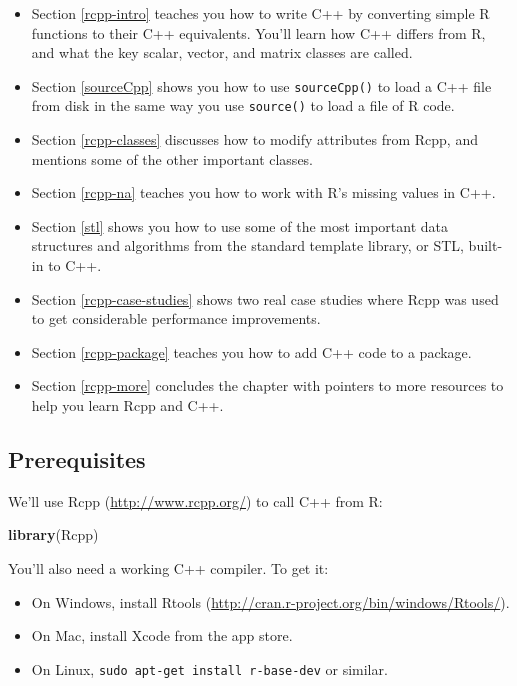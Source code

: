 \documentclass[]{book}
\newenvironment{Shaded}{\begin{snugshade}}{\end{snugshade}}
\newcommand{\KeywordTok}[1]{\textcolor[rgb]{0.27,0.27,0.27}{\textbf{#1}}}
\newcommand{\NormalTok}[1]{#1}
\providecommand{\tightlist}{%
  \setlength{\itemsep}{0pt}\setlength{\parskip}{0pt}}
\renewcommand{\href}[2]{#2 (\url{#1})}
\begin{document}
\begin{itemize}
\item
  Section \ref{rcpp-intro} teaches you how to write C++ by
  converting simple R functions to their C++ equivalents. You'll learn how
  C++ differs from R, and what the key scalar, vector, and matrix classes
  are called.
\item
  Section \ref{sourceCpp} shows you how to use \texttt{sourceCpp()} to load
  a C++ file from disk in the same way you use \texttt{source()} to load a file of
  R code.
\item
  Section \ref{rcpp-classes} discusses how to modify
  attributes from Rcpp, and mentions some of the other important classes.
\item
  Section \ref{rcpp-na} teaches you how to work with R's missing values
  in C++.
\item
  Section \ref{stl} shows you how to use some of the most important data
  structures and algorithms from the standard template library, or STL,
  built-in to C++.
\item
  Section \ref{rcpp-case-studies} shows two real case studies where
  Rcpp was used to get considerable performance improvements.
\item
  Section \ref{rcpp-package} teaches you how to add C++ code
  to a package.
\item
  Section \ref{rcpp-more} concludes the chapter with pointers to
  more resources to help you learn Rcpp and C++.
\end{itemize}

\hypertarget{prerequisites-7}{%
\subsection*{Prerequisites}\label{prerequisites-7}}

We'll use \href{http://www.rcpp.org/}{Rcpp} to call C++ from R:

\begin{Shaded}
\begin{Highlighting}[]
\KeywordTok{library}\NormalTok{(Rcpp)}
\end{Highlighting}
\end{Shaded}

You'll also need a working C++ compiler. To get it:

\begin{itemize}
\tightlist
\item
  On Windows, install \href{http://cran.r-project.org/bin/windows/Rtools/}{Rtools}.
\item
  On Mac, install Xcode from the app store.
\item
  On Linux, \texttt{sudo\ apt-get\ install\ r-base-dev} or similar.
\end{itemize}
\end{document}
